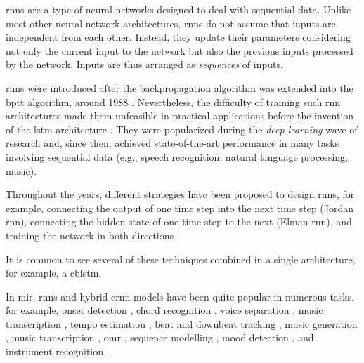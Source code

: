 

\glspl{rnn} are a type of neural networks designed to deal
with sequential data. Unlike most other neural network
architectures, \glspl{rnn} do not assume that inputs are
independent from each other. Instead, they update their
parameters considering not only the current input to the
network but also the previous inputs processed by the
network. Inputs are thus arranged as \emph{sequences} of
inputs.

\glspl{rnn} were introduced after the backpropagation
algorithm \parencite{rumelhart1988learning} was extended
into the \gls{bptt} algorithm, around 1988
\parencite{werbos1988generalization,
werbos1990backpropagation}. Nevertheless, the difficulty of
training such \gls{rnn} architectures made them unfeasible
in practical applications before the invention of the
\gls{lstm} architecture \parencite{hochreiter1997long}. They
were popularized during the \emph{deep learning} wave of
research and, since then, achieved state-of-the-art
performance in many tasks involving sequential data (e.g.,
speech recognition, natural language processing, music).

Throughout the years, different strategies have been
proposed to design \glspl{rnn}, for example, connecting the
output of one time step into the next time step (Jordan
\gls{rnn}), connecting the hidden state of one time step to
the next (Elman \gls{rnn}), and training the network in both
directions \parencite{schuster1997bidirectional}.

It is common to see several of these techniques combined in
a single architecture, for example, a \gls{cblstm}.

In \gls{mir}, \glspl{rnn} and hybrid \gls{crnn} models have
been quite popular in numerous tasks, for example, onset
detection \parencite{eyben2010universal}, chord recognition
\parencite{boulangerlewandowski2013audio, sigtia2016endend,
sears2018evaluating}, voice separation
\parencite{huang2014singingvoice}, music transcription
\parencite{sigtia2014rnnbased}, tempo estimation
\parencite{bock2015accurate}, beat and downbeat tracking
\parencite{bock2016joint, krebs2016downbeat}, music
generation \parencite{liu2016predicting, liang2017automatic,
lim2017chord}, music transcription
\parencite{rigaud2016singing, sigtia2016endend,
southall2016automatic, vogl2016recurrent,
southall2017automatic, vogl2017drum, basaran2018main},
\gls{omr} \parencite{calvozaragoza2017onestep,
wel2017optical, calvozaragoza2018cameraprimus}, sequence
modelling \parencite{ycart2017study}, mood detection
\parencite{delbouys2018music}, and instrument recognition
\parencite{gururani2018instrument}.



